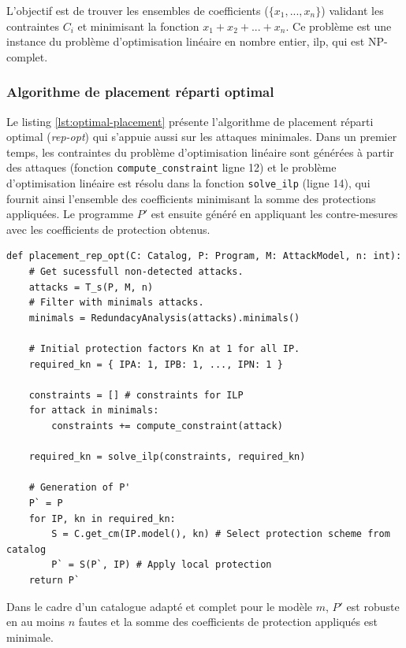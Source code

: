                 L'objectif est de trouver les ensembles de coefficients ($\{x_1, ..., x_n\}$) validant les contraintes $C_i$ et minimisant la fonction $x_1 + x_2 + ... + x_n$. 
                Ce problème est une instance du problème d'optimisation linéaire en nombre entier, \gls{ilp}, qui est NP-complet.
        
            \subsubsection{Algorithme de placement réparti optimal}
            \label{sec:placement-optimal-algo}
            
                Le listing \ref{lst:optimal-placement} présente l'algorithme de placement réparti optimal (\textit{rep-opt}) qui s'appuie aussi sur les attaques minimales.
                Dans un premier temps, les contraintes du problème d'optimisation linéaire sont générées à partir des attaques (fonction \texttt{compute\_constraint} ligne 12) et le problème d'optimisation linéaire est résolu dans la fonction \texttt{solve\_ilp} (ligne 14), qui fournit ainsi l'ensemble des coefficients minimisant la somme des protections appliquées.
                Le programme $P'$ est ensuite généré en appliquant les contre-mesures avec les coefficients de protection obtenus.

\begin{lstlisting}  
def placement_rep_opt(C: Catalog, P: Program, M: AttackModel, n: int):
    # Get sucessfull non-detected attacks.
    attacks = T_s(P, M, n)
    # Filter with minimals attacks.
    minimals = RedundacyAnalysis(attacks).minimals()
    
    # Initial protection factors Kn at 1 for all IP.
    required_kn = { IPA: 1, IPB: 1, ..., IPN: 1 }
    
    constraints = [] # constraints for ILP
    for attack in minimals:
        constraints += compute_constraint(attack)
    
    required_kn = solve_ilp(constraints, required_kn)
    
    # Generation of P'
    P` = P
    for IP, kn in required_kn:
        S = C.get_cm(IP.model(), kn) # Select protection scheme from catalog
        P` = S(P`, IP) # Apply local protection        
    return P`
\end{lstlisting} 

                Dans le cadre d'un catalogue adapté et complet pour le modèle $m$, $P'$ est robuste en au moins $n$ fautes et la somme des coefficients de protection appliqués est minimale.
    
